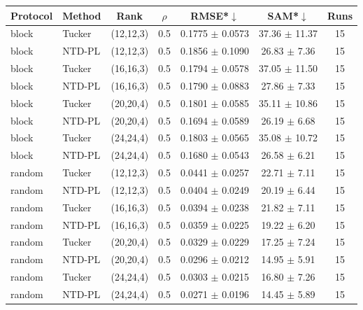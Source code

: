 \begin{tabular}{@{}l l c c c c c@{}}
\toprule
Protocol & Method & Rank & $\rho$ & RMSE*$\downarrow$ & SAM*$\downarrow$ & Runs\\
\midrule
block & Tucker & (12,12,3) & 0.5 & 0.1775 $\pm$ 0.0573 & 37.36 $\pm$ 11.37 & 15\\
block & NTD-PL & (12,12,3) & 0.5 & 0.1856 $\pm$ 0.1090 & 26.83 $\pm$ 7.36 & 15\\
block & Tucker & (16,16,3) & 0.5 & 0.1794 $\pm$ 0.0578 & 37.05 $\pm$ 11.50 & 15\\
block & NTD-PL & (16,16,3) & 0.5 & 0.1790 $\pm$ 0.0883 & 27.86 $\pm$ 7.33 & 15\\
block & Tucker & (20,20,4) & 0.5 & 0.1801 $\pm$ 0.0585 & 35.11 $\pm$ 10.86 & 15\\
block & NTD-PL & (20,20,4) & 0.5 & 0.1694 $\pm$ 0.0589 & 26.19 $\pm$ 6.68 & 15\\
block & Tucker & (24,24,4) & 0.5 & 0.1803 $\pm$ 0.0565 & 35.08 $\pm$ 10.72 & 15\\
block & NTD-PL & (24,24,4) & 0.5 & 0.1680 $\pm$ 0.0543 & 26.58 $\pm$ 6.21 & 15\\
random & Tucker & (12,12,3) & 0.5 & 0.0441 $\pm$ 0.0257 & 22.71 $\pm$ 7.11 & 15\\
random & NTD-PL & (12,12,3) & 0.5 & 0.0404 $\pm$ 0.0249 & 20.19 $\pm$ 6.44 & 15\\
random & Tucker & (16,16,3) & 0.5 & 0.0394 $\pm$ 0.0238 & 21.82 $\pm$ 7.11 & 15\\
random & NTD-PL & (16,16,3) & 0.5 & 0.0359 $\pm$ 0.0225 & 19.22 $\pm$ 6.20 & 15\\
random & Tucker & (20,20,4) & 0.5 & 0.0329 $\pm$ 0.0229 & 17.25 $\pm$ 7.24 & 15\\
random & NTD-PL & (20,20,4) & 0.5 & 0.0296 $\pm$ 0.0212 & 14.95 $\pm$ 5.91 & 15\\
random & Tucker & (24,24,4) & 0.5 & 0.0303 $\pm$ 0.0215 & 16.80 $\pm$ 7.26 & 15\\
random & NTD-PL & (24,24,4) & 0.5 & 0.0271 $\pm$ 0.0196 & 14.45 $\pm$ 5.89 & 15\\
\bottomrule
\end{tabular}
